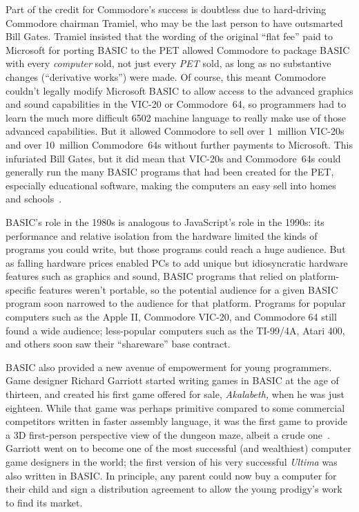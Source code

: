 Part of the credit for Commodore's success is doubtless due to
hard-driving Commodore chairman Tramiel, who may be the last person to
have outsmarted Bill Gates.
Tramiel insisted that the wording of the original ``flat fee'' paid to
Microsoft for porting BASIC to the PET allowed Commodore to package
BASIC with every \emph{computer} sold, not just every \emph{PET} sold,
as long as no substantive changes (``derivative works'') were made.
Of course, this meant Commodore couldn't legally modify Microsoft
BASIC to allow access to the advanced graphics and sound capabilities
in the VIC-20 or Commodore~64, so programmers had to learn the much
more difficult 6502 machine language to really make use of those
advanced capabilities.
But it allowed Commodore to sell over 1~million VIC-20s and over
10~million Commodore~64s without further payments to Microsoft.
This infuriated Bill Gates, but it did mean that VIC-20s and
Commodore~64s could generally run the many BASIC programs that had
been created for the PET, especially educational software, making the
computers an easy sell into homes and
schools~\cite[p. 414]{commodore}.

BASIC's role in the 1980s is analogous to JavaScript's role in the
1990s: its performance and relative isolation from the hardware
limited
the kinds of programs you could write, but those programs could reach a
huge audience.
But as falling hardware prices enabled PCs to add unique but
idiosyncratic hardware features such as graphics and sound, BASIC
programs that relied on
platform-specific features weren't portable, so the potential audience
for a given BASIC program soon narrowed to the audience for that
platform.  Programs for popular computers such as the Apple II,
Commodore VIC-20, and Commodore 64 still found a wide audience;
less-popular computers such as the TI-99/4A, Atari 400, and others soon
saw their ``shareware'' base contract.

BASIC also provided a new avenue of empowerment for young programmers.
Game designer Richard Garriott started writing games in BASIC at the age
of thirteen, and created his first game offered for sale,
\emph{Akalabeth,} when he was just eighteen.
While that game was perhaps primitive compared to some commercial
competitors written in faster assembly language, it was the first game
to provide a 3D first-person perspective view of the dungeon maze,
albeit a crude one~\cite{akalabeth}.
Garriott went on to become one of the most successful (and
wealthiest) computer game designers in the world; the first version of
his very successful \emph{Ultima} was also written in BASIC.
In principle, any parent could now buy a computer for their child and
sign a distribution agreement to allow the young prodigy's work to
find its market.

